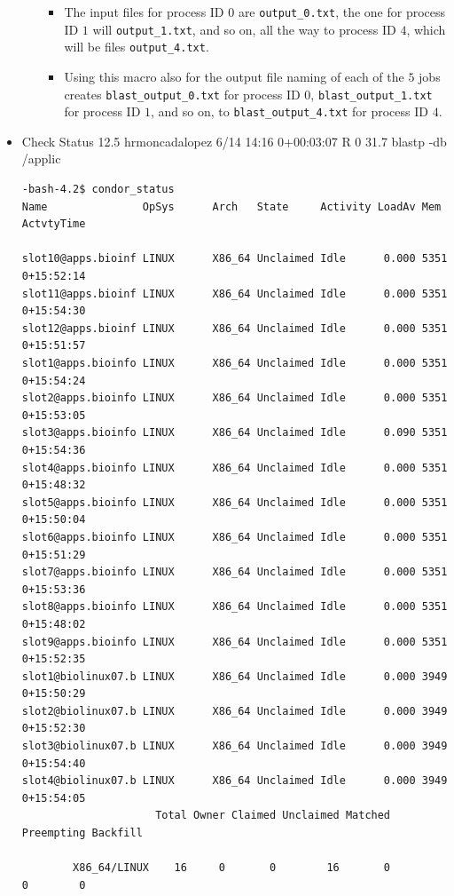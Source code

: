 \documentclass{article}
\begin{document}
\begin{itemize}
\begin{itemize}
\begin{itemize}
\item The input files for process ID $0$ are \verb+output_0.txt+, the one for process ID $1$ will \verb+output_1.txt+, and so on, all the way to process ID $4$, which will be files \verb+output_4.txt+. 
\item Using this macro also for the output file naming of each of the $5$ jobs creates \verb+blast_output_0.txt+ for process ID $0$, \verb+blast_output_1.txt+ for process ID $1$, and so on, to \verb+blast_output_4.txt+ for process ID $4$.
\end{itemize}
\end{itemize}
\item Check Status
\scriptsize  12.5   hrmoncadalopez  6/14 14:16   0+00:03:07 R  0   31.7 blastp -db /applic
\begin{verbatim}
-bash-4.2$ condor_status
Name               OpSys      Arch   State     Activity LoadAv Mem   ActvtyTime

slot10@apps.bioinf LINUX      X86_64 Unclaimed Idle      0.000 5351  0+15:52:14
slot11@apps.bioinf LINUX      X86_64 Unclaimed Idle      0.000 5351  0+15:54:30
slot12@apps.bioinf LINUX      X86_64 Unclaimed Idle      0.000 5351  0+15:51:57
slot1@apps.bioinfo LINUX      X86_64 Unclaimed Idle      0.000 5351  0+15:54:24
slot2@apps.bioinfo LINUX      X86_64 Unclaimed Idle      0.000 5351  0+15:53:05
slot3@apps.bioinfo LINUX      X86_64 Unclaimed Idle      0.090 5351  0+15:54:36
slot4@apps.bioinfo LINUX      X86_64 Unclaimed Idle      0.000 5351  0+15:48:32
slot5@apps.bioinfo LINUX      X86_64 Unclaimed Idle      0.000 5351  0+15:50:04
slot6@apps.bioinfo LINUX      X86_64 Unclaimed Idle      0.000 5351  0+15:51:29
slot7@apps.bioinfo LINUX      X86_64 Unclaimed Idle      0.000 5351  0+15:53:36
slot8@apps.bioinfo LINUX      X86_64 Unclaimed Idle      0.000 5351  0+15:48:02
slot9@apps.bioinfo LINUX      X86_64 Unclaimed Idle      0.000 5351  0+15:52:35
slot1@biolinux07.b LINUX      X86_64 Unclaimed Idle      0.000 3949  0+15:50:29
slot2@biolinux07.b LINUX      X86_64 Unclaimed Idle      0.000 3949  0+15:52:30
slot3@biolinux07.b LINUX      X86_64 Unclaimed Idle      0.000 3949  0+15:54:40
slot4@biolinux07.b LINUX      X86_64 Unclaimed Idle      0.000 3949  0+15:54:05
                     Total Owner Claimed Unclaimed Matched Preempting Backfill

        X86_64/LINUX    16     0       0        16       0          0        0


\end{verbatim}
\end{itemize}
\end{document}
